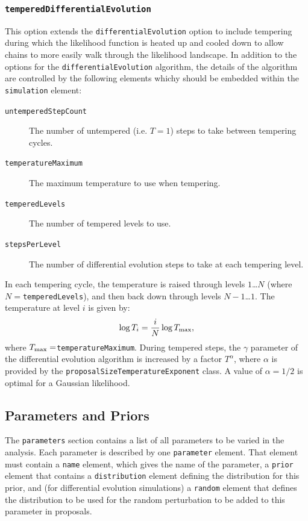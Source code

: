 \subsubsection{{\tt temperedDifferentialEvolution}}

This option extends the {\tt differentialEvolution} option to include tempering during which the likelihood function is heated up and cooled down to allow chains to more easily walk through the likelihood landscape. In addition to the options for the {\tt differentialEvolution} algorithm, the details of the algorithm are controlled by the following elements whichy should be embedded within the {\tt simulation} element:
\begin{description}
\item[{\tt untemperedStepCount}] The number of untempered (i.e. $T=1$) steps to take between tempering cycles.
\item[{\tt temperatureMaximum}] The maximum temperature to use when tempering.
\item[{\tt temperedLevels}] The number of tempered levels to use.
\item[{\tt stepsPerLevel}] The number of differential evolution steps to take at each tempering level.
\end{description}

In each tempering cycle, the temperature is raised through levels $1$\ldots$N$ (where $N=${\tt temperedLevels}), and then back down through levels $N-1$\ldots$1$. The temperature at level $i$ is given by:
\begin{equation}
\log T_i = {i \over N} \log T_{\rm max},
\end{equation}
where $T_{\rm max}=${\tt temperatureMaximum}. During tempered steps, the $\gamma$ parameter of the differential evolution algorithm is increased by a factor $T^\alpha$, where $\alpha$ is provided by the {\tt proposalSizeTemperatureExponent} class. A value of $\alpha=1/2$ is optimal for a Gaussian likelihood.

\subsection{Parameters and Priors}\label{sec:ParametersPriors}

The {\tt parameters} section contains a list of all parameters to be varied in the analysis. Each parameter is described by one {\tt parameter} element. That element must contain a {\tt name} element, which gives the name of the parameter, a {\tt prior} element that contains a {\tt distribution} element defining the distribution for this prior, and (for differential evolution simulations) a {\tt random} element that defines the distribution to be used for the random perturbation to be added to this parameter in proposals.

